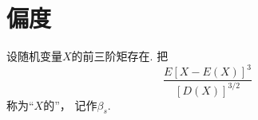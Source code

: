 \section{偏度}
\begin{definition}
设随机变量\(X\)的前三阶矩存在.
把\[
	\frac{E[X-E(X)]^3}{[D(X)]^{3/2}}
\]称为“\(X\)的”，
记作\(\beta_s\).
\end{definition}
